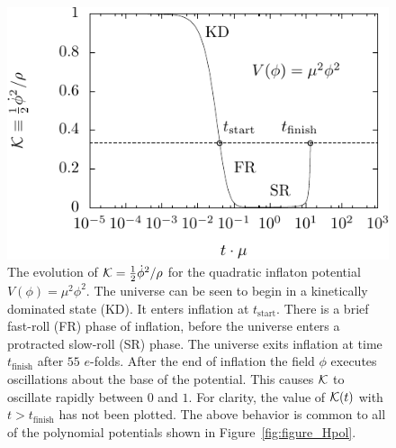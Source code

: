 %
\begin{figure}[tp]
  \includegraphics[width=\textwidth]{chapters/kinetic_dominance/figures/Kpol} 
  \caption{The evolution of \(\mathcal{K} = \frac{1}{2}\dot{\phi}^2/\rho\) for the quadratic inflaton potential \(V(\phi) = \mu^2 \phi^2\).  The universe can be seen to begin in a kinetically dominated state (KD).  It enters inflation at \(t_\mathrm{start}\). There is a brief fast-roll (FR) phase of inflation, before the universe enters a protracted slow-roll (SR) phase. The universe exits inflation at time \(t_\mathrm{finish}\) after \(55\) \(e\)-folds. After the end of inflation the field \(\phi\) executes oscillations about the base of the potential. This causes \(\mathcal{K}\) to oscillate rapidly between \(0\) and \(1\). For clarity, the value of \(\mathcal{K}(t)\) with \(t>t_\mathrm{finish}\) has not been plotted. The above behavior is common to all of the  polynomial potentials shown in Figure~\protect\ref{fig:figure_Hpol}.}\label{fig:figure_Kpol}
\end{figure}
%

